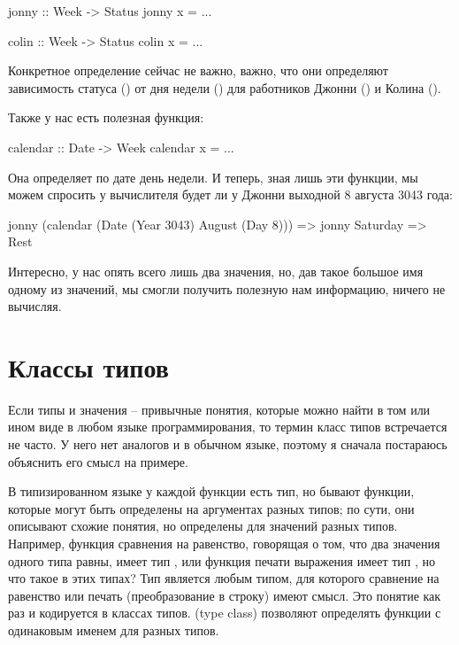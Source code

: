 \begin{code}
jonny :: Week -> Status
jonny x = ...

colin :: Week -> Status
colin x = ...
\end{code}

Конкретное определение сейчас не важно, важно, что они определяют
зависимость статуса () от дня недели () для
работников Джонни () и Колина ().

Также у нас есть полезная функция:


\begin{code}
calendar :: Date -> Week
calendar x = ...
\end{code}

Она определяет по дате день недели. И теперь, зная лишь эти функции, мы
можем спросить у вычислителя будет ли у Джонни выходной 8 августа 3043
года:


\begin{code}
jonny (calendar (Date (Year 3043) August (Day 8)))
=> jonny Saturday
=> Rest
\end{code}

Интересно, у нас опять всего лишь два значения, но, дав такое большое
имя одному из значений, мы смогли получить полезную нам информацию,
ничего не вычисляя.

\section{Классы типов}

Если типы и значения -- привычные понятия, которые можно найти в том или
ином виде в любом языке программирования, то термин класс типов
встречается не часто. У него нет аналогов и в обычном языке, поэтому я
сначала постараюсь объяснить его смысл на примере.

В типизированном языке у каждой функции есть тип, но бывают функции,
которые могут быть определены на аргументах разных типов; по сути, они
описывают схожие понятия, но определены для значений разных типов.
Например, функция сравнения на равенство, говорящая о том, что два
значения одного типа  равны, имеет тип , или
функция печати выражения имеет тип , но что такое 
в этих типах? Тип  является любым типом, для которого сравнение на
равенство или печать (преобразование в строку) имеют смысл. Это понятие
как раз и кодируется в классах типов.  (type class)
позволяют определять функции с одинаковым именем для разных типов.

